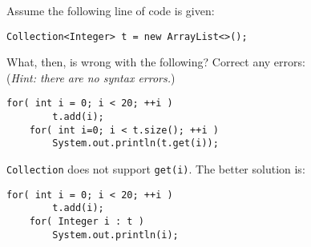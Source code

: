 Assume the following line of code is given:
\begin{lstlisting}[numbers=none]
	Collection<Integer> t = new ArrayList<>();
\end{lstlisting}

What, then, is wrong with the following? Correct any errors: \\
(\textit{Hint: there are no syntax errors.})
\begin{lstlisting}[numbers=none]
	for( int i = 0; i < 20; ++i )
		t.add(i);
	for( int i=0; i < t.size(); ++i )
		System.out.println(t.get(i));
\end{lstlisting}

\begin{answer}
\texttt{Collection} does not support \texttt{get(i)}. The better solution is:
\begin{lstlisting}[numbers=none]
	for( int i = 0; i < 20; ++i )
		t.add(i);
	for( Integer i : t )
		System.out.println(i);
\end{lstlisting}
\end{answer}

